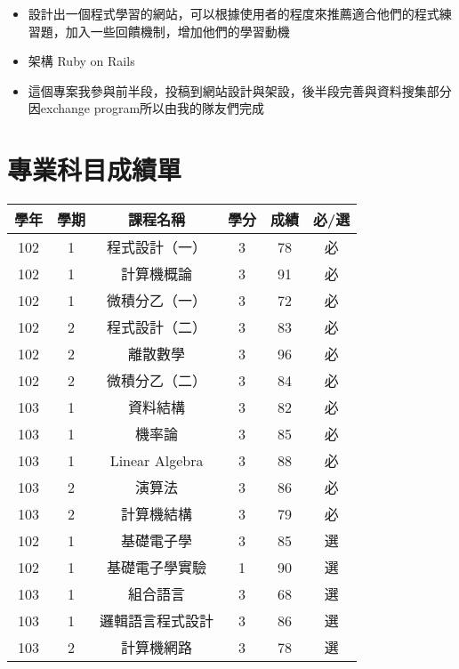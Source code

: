 \documentclass[10pt,a4paper]{altacv}
\begin{document}
\begin{itemize}
\item 設計出一個程式學習的網站，可以根據使用者的程度來推薦適合他們的程式練習題，加入一些回饋機制，增加他們的學習動機
\item 架構 Ruby on Rails
\item 這個專案我參與前半段，投稿到網站設計與架設，後半段完善與資料搜集部分因exchange program所以由我的隊友們完成
\end{itemize}

\clearpage
\section{專業科目成績單}

\begin{center}
\begin{tabular}{|c|c|c|c|c|c|}
\hline
學年     & 學期 & 課程名稱       & 學分    & 成績 & 必/選 \\ \hline
102    & 1  & 程式設計（一）    & 3     & 78 & 必   \\ \hline
102    & 1  & 計算機概論      & 3     & 91 & 必   \\ \hline
102    & 1  & 微積分乙（一）    & 3     & 72 & 必   \\ \hline
102    & 2  & 程式設計（二）    & 3     & 83 & 必   \\ \hline
102    & 2  & 離散數學       & 3     & 96 & 必   \\ \hline
102    & 2  & 微積分乙（二）    & 3     & 84 & 必   \\ \hline
103    & 1  & 資料結構       & 3     & 82 & 必   \\ \hline
103    & 1  & 機率論        & 3     & 85 & 必   \\ \hline
103    & 1  & Linear Algebra       & 3     & 88 & 必   \\ \hline
103    & 2  & 演算法        & 3     & 86 & 必   \\ \hline
103    & 2  & 計算機結構      & 3     & 79 & 必   \\ \hline
102    & 1  & 基礎電子學      & 3     & 85 & 選   \\ \hline
102    & 1  & 基礎電子學實驗    & 1     & 90 & 選   \\ \hline
103    & 1  & 組合語言       & 3     & 68 & 選   \\ \hline
103    & 1  & 邏輯語言程式設計   & 3     & 86 & 選   \\ \hline
103    & 2  & 計算機網路      & 3     & 78 & 選   \\ \hline

\end{tabular}
\end{center}
\end{document}
